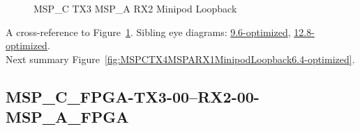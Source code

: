 \begin{figure}[h]
\begin{subfigure}{0.33\textwidth}
\hyperref[sec:MSPCFPGATX306RX206MSPAFPGA6.4-optimized]{}
\end{subfigure}\hspace*{\fill}
\begin{subfigure}{0.33\textwidth}
\hyperref[sec:MSPCFPGATX307RX207MSPAFPGA6.4-optimized]{}
\end{subfigure}\hspace*{\fill}
\begin{subfigure}{0.33\textwidth}
\hyperref[sec:MSPCFPGATX308RX208MSPAFPGA6.4-optimized]{}
\end{subfigure}

\begin{subfigure}{0.33\textwidth}
\hyperref[sec:MSPCFPGATX309RX209MSPAFPGA6.4-optimized]{}
\end{subfigure}\hspace*{\fill}
\begin{subfigure}{0.33\textwidth}
\hyperref[sec:MSPCFPGATX310RX210MSPAFPGA6.4-optimized]{}
\end{subfigure}\hspace*{\fill}
\begin{subfigure}{0.33\textwidth}
\hyperref[sec:MSPCFPGATX311RX211MSPAFPGA6.4-optimized]{}
\end{subfigure}

\caption{MSP\_C TX3 MSP\_A RX2 Minipod Loopback} \label{fig:MSPCTX3MSPARX2MinipodLoopback6.4-optimized}
\end{figure}

A cross-reference to Figure~\ref{fig:MSPCTX3MSPARX2MinipodLoopback6.4-optimized}.
Sibling eye diagrams: \hyperref[sec:MSPCTX3MSPARX2MinipodLoopback9.6-optimized]{9.6-optimized}, \hyperref[sec:MSPCTX3MSPARX2MinipodLoopback12.8-optimized]{12.8-optimized}. \\
Next summary Figure~\ref{fig:MSPCTX4MSPARX1MinipodLoopback6.4-optimized}.
\clearpage
% 
\subsection{MSP\_C\_FPGA-TX3-00--RX2-00-MSP\_A\_FPGA}\label{sec:MSPCFPGATX300RX200MSPAFPGA6.4-optimized}

